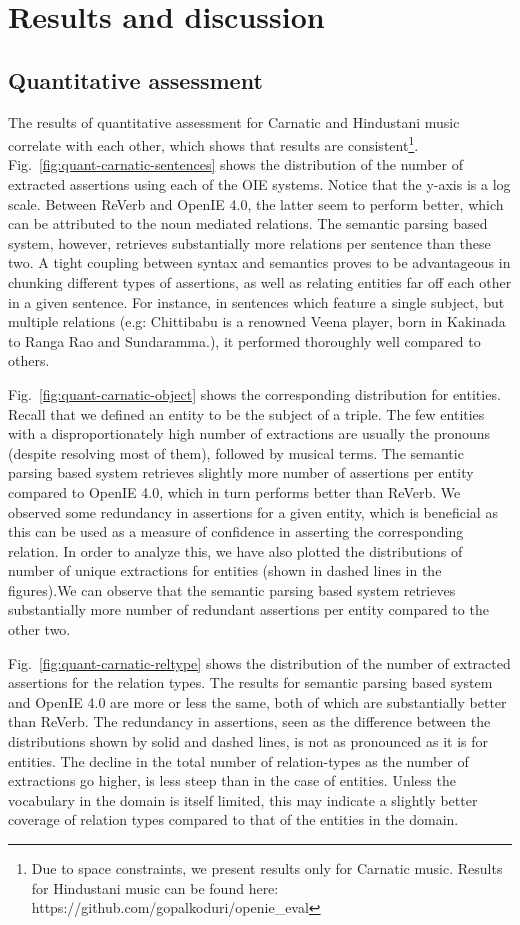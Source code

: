 \documentclass{llncs}
\begin{document}
\section{Results and discussion}
\label{sec:results}
\subsection{Quantitative assessment}
The results of quantitative assessment for Carnatic and Hindustani music correlate with each other, which shows that results are consistent\footnote{Due to space constraints, we present results only for Carnatic music. Results for Hindustani music can be found here: https://github.com/gopalkoduri/openie\_eval}. Fig.~\ref{fig:quant-carnatic-sentences} shows the distribution of the number of extracted assertions using each of the OIE systems. Notice that the y-axis is a log scale. Between ReVerb and OpenIE 4.0, the latter seem to perform better, which can be attributed to the noun mediated relations. The semantic parsing based system, however, retrieves substantially more relations per sentence than these two. A tight coupling between syntax and semantics proves to be advantageous in chunking different types of assertions, as well as relating entities far off each other in a given sentence. For instance, in sentences which feature a single subject, but multiple relations (e.g: Chittibabu is a renowned Veena player, born in Kakinada to Ranga Rao and Sundaramma.), it performed thoroughly well compared to others.

Fig.~\ref{fig:quant-carnatic-object} shows the corresponding distribution for entities. Recall that we defined an entity to be the subject of a triple. The few entities with a disproportionately high number of extractions are usually the pronouns (despite resolving most of them), followed by musical terms. The semantic parsing based system retrieves slightly more number of assertions per entity compared to OpenIE 4.0, which in turn performs better than ReVerb. We observed some redundancy in assertions for a given entity, which is beneficial as this can be used as a measure of confidence in asserting the corresponding relation. In order to analyze this, we have also plotted the distributions of number of unique extractions for entities (shown in dashed lines in the figures).We can observe that the semantic parsing based system retrieves substantially more number of redundant assertions per entity compared to the other two.

Fig.~\ref{fig:quant-carnatic-reltype} shows the distribution of the number of extracted assertions for the relation types. The results for semantic parsing based system and OpenIE 4.0 are more or less the same, both of which are substantially better than ReVerb. The redundancy in assertions, seen as the difference between the distributions shown by solid and dashed lines, is not as pronounced as it is for entities. The decline in the total number of relation-types as the number of extractions go higher, is less steep than in the case of entities. Unless the vocabulary in the domain is itself limited, this may indicate a slightly better coverage of relation types compared to that of the entities in the domain.
\end{document}
